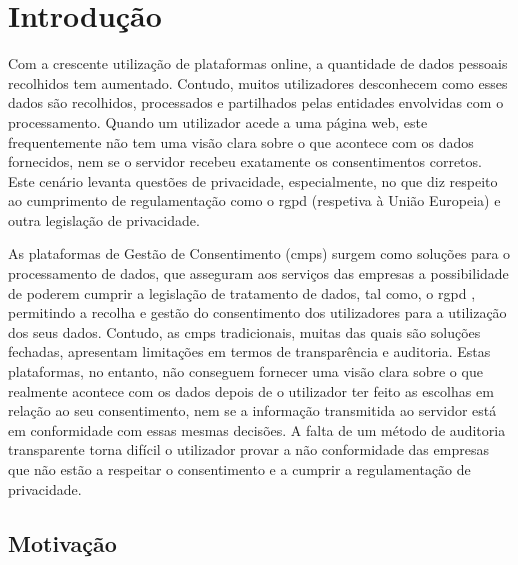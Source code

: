 \chapter{Introdução}
\label{cap:introducao}

Com a crescente utilização de plataformas online, a quantidade de dados pessoais recolhidos tem aumentado. Contudo, muitos utilizadores desconhecem como esses dados são recolhidos, processados e partilhados pelas entidades envolvidas com o processamento. Quando um utilizador acede a uma página web, este frequentemente não tem uma visão clara sobre o que acontece com os dados fornecidos, nem se o servidor recebeu exatamente os consentimentos corretos. Este cenário levanta questões de privacidade, especialmente, no que diz respeito ao cumprimento de regulamentação como o \acrfull{rgpd} (respetiva à União Europeia) e outra legislação de privacidade.

As plataformas de Gestão de Consentimento (\acrshort{cmp}s) surgem como soluções para o processamento de dados, que asseguram aos serviços das empresas a possibilidade de poderem cumprir a legislação de tratamento de dados, tal como, o \acrshort{rgpd} \citep{Santos2021}, permitindo a recolha e gestão do consentimento dos utilizadores para a utilização dos seus dados. Contudo, as \acrshort{cmp}s tradicionais, muitas das quais são soluções fechadas, apresentam limitações em termos de transparência e auditoria. 
Estas plataformas, no entanto, não conseguem fornecer uma visão clara sobre o que realmente acontece com os dados depois de o utilizador ter feito as escolhas em relação ao seu consentimento, nem se a informação transmitida ao servidor está em conformidade com essas mesmas decisões. A falta de um método de auditoria transparente torna difícil o utilizador provar a não conformidade das empresas que não estão a respeitar o consentimento e a cumprir a regulamentação de privacidade.

\section{Motivação}

